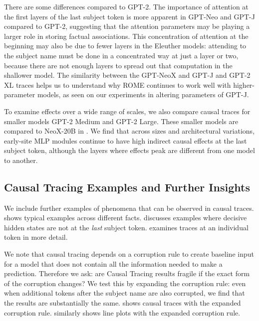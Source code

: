 There are some differences compared to GPT-2.   The importance of attention at the first layers of the last subject token is more apparent in GPT-Neo and GPT-J compared to GPT-2,   suggesting that the attention parameters may be playing a larger role in storing factual associations.  This concentration of attention at the beginning may also be due to fewer layers in the Eleuther models: attending to the subject name must be done in a concentrated way at just a layer or two, because there are not enough layers to spread out that computation in the shallower model.
The similarity between the GPT-NeoX and GPT-J and GPT-2 XL traces helps us to understand why ROME continues to work well with higher-parameter models, as seen on our experiments in altering parameters of GPT-J.

To examine effects over a wide range of scales, we also compare causal traces for smaller models GPT-2 Medium and GPT-2 Large.  These smaller models are compared to NeoX-20B in .  We find that across sizes and architectural variations, early-site MLP modules continue to have high indirect causal effects at the last subject token, although the layers where effects peak are different from one model to another.

\subsection{Causal Tracing Examples and Further Insights}
\label{apd:causal-tracing-variations}

We include further examples of phenomena that can be observed in causal traces.  shows typical examples across different facts.  discusses examples where decisive hidden states are not at the \textit{last} subject token.   examines traces at an individual token in more detail. 

We note that causal tracing depends on a corruption rule to create baseline input for a model that does not contain all the information needed to make a prediction.  Therefore we ask: are Causal Tracing results fragile if the exact form of the corruption changes?  We test this by expanding the corruption rule: even when additional tokens after the subject name are also corrupted, we find that the results are substantially the same.  shows causal traces with the expanded corruption rule.
 similarly shows line plots with the expanded corruption rule.

